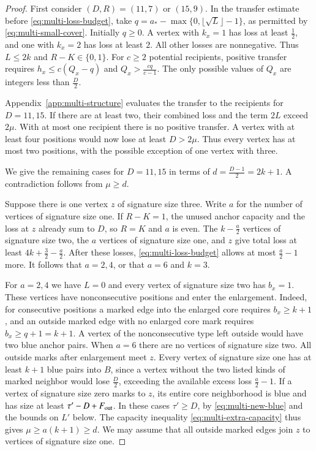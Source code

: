 \begin{proof}
First consider $(D,R)=(11,7)$ or $(15,9)$. In the transfer
estimate before \eqref{eq:multi-loss-budget}, take
$q=a_*-\max\{0,\lfloor\sqrt{L}\rfloor-1\}$, as permitted by
\eqref{eq:multi-small-cover}.
Initially $q\ge0$. A vertex with $k_x=1$ has loss at least
$\frac{1}{2}$, and one with $k_x=2$ has loss at least $2$. All other
losses are nonnegative. Thus $L\le 2k$ and $R-K\in\{0,1\}$. For $c\ge2$
potential recipients, positive transfer requires
$h_x\le c(Q_x-q)$ and $Q_x>\frac{cq}{c-1}$. The only possible values of $Q_x$ are integers less than $\frac{D}{2}$.

Appendix~\ref{app:multi-structure} evaluates the transfer to the
recipients for $D=11,15$. If there are at least two, their combined
loss and the term $2L$ exceed $2\mu$. With at most one recipient
there is no positive transfer. A vertex with at least four positions
would now lose at least $D>2\mu$. Thus every vertex has at most
two positions, with the possible exception of one vertex with three.

We give the remaining cases for $D=11,15$ in terms of
$d=\frac{D-1}{2}=2k+1$. A contradiction follows from $\mu\ge d$.


Suppose there is one vertex $z$ of signature size three. Write $a$
for the number of vertices of signature size one. If $R-K=1$, the
unused anchor capacity and the loss at $z$ already sum to $D$, so
$R=K$ and $a$ is even. The $k-\frac{a}{2}$ vertices of signature size
two, the $a$ vertices of signature size one, and $z$ give total
loss at least $4k+\frac{3}{2}-\frac{a}{2}$. After these losses,
\eqref{eq:multi-loss-budget} allows at most $\frac{a}{2}-1$ more.
It follows that $a=2,4$, or that $a=6$ and $k=3$.

For $a=2,4$ we have $L=0$ and every vertex of signature size two
has $b_x=1$. These vertices have nonconsecutive positions and
enter the enlargement. Indeed, for consecutive positions a marked
edge into the enlarged core requires $b_x\ge k+1$, and an outside
marked edge with no enlarged core mark requires $b_x\ge q+1=k+1$.
A vertex of the nonconsecutive type left outside would have two
blue anchor pairs. When $a=6$ there are no vertices of signature
size two. All outside marks after enlargement meet $z$. Every
vertex of signature size one has at least $k+1$ blue pairs into
$B$, since a vertex without the two listed kinds of marked neighbor
would lose $\frac{D}{2}$, exceeding the available excess loss
$\frac{a}{2}-1$. If a vertex of signature size zero marks to $z$,
its entire core neighborhood is blue and has size at least
$\tau'-D+F_{\rm out}$. In these cases $\tau'\ge D$, by
\eqref{eq:multi-new-blue} and the bounds on $L'$ below. The
capacity inequality \eqref{eq:multi-extra-capacity} thus gives
$\mu\ge a(k+1)\ge d$. We may assume that all outside marked
edges join $z$ to vertices of signature size one.


\end{proof}
